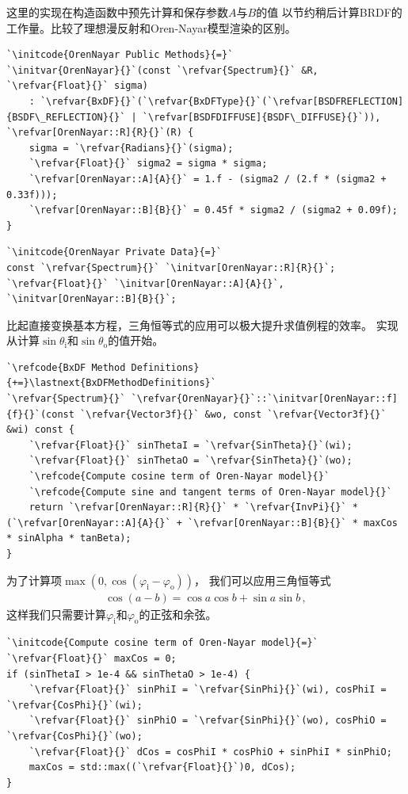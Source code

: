 这里的实现在构造函数中预先计算和保存参数$A$与$B$的值
以节约稍后计算BRDF的工作量。比较了理想漫反射和Oren-Nayar模型渲染的区别。
\begin{lstlisting}
`\initcode{OrenNayar Public Methods}{=}`
`\initvar{OrenNayar}{}`(const `\refvar{Spectrum}{}` &R, `\refvar{Float}{}` sigma) 
    : `\refvar{BxDF}{}`(`\refvar{BxDFType}{}`(`\refvar[BSDFREFLECTION]{BSDF\_REFLECTION}{}` | `\refvar[BSDFDIFFUSE]{BSDF\_DIFFUSE}{}`)), `\refvar[OrenNayar::R]{R}{}`(R) {
    sigma = `\refvar{Radians}{}`(sigma);
    `\refvar{Float}{}` sigma2 = sigma * sigma;
    `\refvar[OrenNayar::A]{A}{}` = 1.f - (sigma2 / (2.f * (sigma2 + 0.33f)));
    `\refvar[OrenNayar::B]{B}{}` = 0.45f * sigma2 / (sigma2 + 0.09f);
}
\end{lstlisting}
\begin{lstlisting}
`\initcode{OrenNayar Private Data}{=}`
const `\refvar{Spectrum}{}` `\initvar[OrenNayar::R]{R}{}`;
`\refvar{Float}{}` `\initvar[OrenNayar::A]{A}{}`, `\initvar[OrenNayar::B]{B}{}`;
\end{lstlisting}

比起直接变换基本方程，三角恒等式的应用可以极大提升求值例程的效率。
实现从计算$\sin\theta_{\mathrm{i}}$和$\sin\theta_{\mathrm{o}}$的值开始。
\begin{lstlisting}
`\refcode{BxDF Method Definitions}{+=}\lastnext{BxDFMethodDefinitions}`
`\refvar{Spectrum}{}` `\refvar{OrenNayar}{}`::`\initvar[OrenNayar::f]{f}{}`(const `\refvar{Vector3f}{}` &wo, const `\refvar{Vector3f}{}` &wi) const {
    `\refvar{Float}{}` sinThetaI = `\refvar{SinTheta}{}`(wi);
    `\refvar{Float}{}` sinThetaO = `\refvar{SinTheta}{}`(wo);
    `\refcode{Compute cosine term of Oren-Nayar model}{}`
    `\refcode{Compute sine and tangent terms of Oren-Nayar model}{}`
    return `\refvar[OrenNayar::R]{R}{}` * `\refvar{InvPi}{}` * (`\refvar[OrenNayar::A]{A}{}` + `\refvar[OrenNayar::B]{B}{}` * maxCos * sinAlpha * tanBeta);
}
\end{lstlisting}

为了计算项$\max(0,\cos(\varphi_{\mathrm{i}}-\varphi_{\mathrm{o}}))$，
我们可以应用三角恒等式
\begin{align*}
    \cos(a-b)=\cos a\cos b+\sin a\sin b\, ,
\end{align*}
这样我们只需要计算$\varphi_{\mathrm{i}}$和$\varphi_{\mathrm{o}}$的正弦和余弦。
\begin{lstlisting}
`\initcode{Compute cosine term of Oren-Nayar model}{=}`
`\refvar{Float}{}` maxCos = 0;
if (sinThetaI > 1e-4 && sinThetaO > 1e-4) {
    `\refvar{Float}{}` sinPhiI = `\refvar{SinPhi}{}`(wi), cosPhiI = `\refvar{CosPhi}{}`(wi);
    `\refvar{Float}{}` sinPhiO = `\refvar{SinPhi}{}`(wo), cosPhiO = `\refvar{CosPhi}{}`(wo);
    `\refvar{Float}{}` dCos = cosPhiI * cosPhiO + sinPhiI * sinPhiO;
    maxCos = std::max((`\refvar{Float}{}`)0, dCos);
}
\end{lstlisting}

